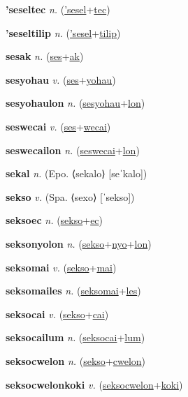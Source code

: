 \textbf{\hypertarget{'seseltec}{'seseltec}} \textit{n.} (\hyperlink{'sesel}{'sesel}+\allowbreak \hyperlink{tec}{tec})


\textbf{\hypertarget{'seseltilip}{'seseltilip}} \textit{n.} (\hyperlink{'sesel}{'sesel}+\allowbreak \hyperlink{tilip}{tilip})


\textbf{\hypertarget{sesak}{sesak}} \textit{n.} (\hyperlink{ses}{ses}+\allowbreak \hyperlink{ak}{ak})


\textbf{\hypertarget{sesyohau}{sesyohau}} \textit{v.} (\hyperlink{ses}{ses}+\allowbreak \hyperlink{yohau}{yohau})


\textbf{\hypertarget{sesyohaulon}{sesyohaulon}} \textit{n.} (\hyperlink{sesyohau}{sesyohau}+\allowbreak \hyperlink{lon}{lon})


\textbf{\hypertarget{seswecai}{seswecai}} \textit{v.} (\hyperlink{ses}{ses}+\allowbreak \hyperlink{wecai}{wecai})


\textbf{\hypertarget{seswecailon}{seswecailon}} \textit{n.} (\hyperlink{seswecai}{seswecai}+\allowbreak \hyperlink{lon}{lon})


\textbf{\hypertarget{sekal}{sekal}} \textit{n.} (Epo. ⟨sekalo⟩ [seˈkalo])


\textbf{\hypertarget{sekso}{sekso}} \textit{v.} (Spa. ⟨sexo⟩ [ˈsekso])


\textbf{\hypertarget{seksoec}{seksoec}} \textit{n.} (\hyperlink{sekso}{sekso}+\allowbreak \hyperlink{ec}{ec})


\textbf{\hypertarget{seksonyolon}{seksonyolon}} \textit{n.} (\hyperlink{sekso}{sekso}+\allowbreak \hyperlink{nyo}{nyo}+\allowbreak \hyperlink{lon}{lon})


\textbf{\hypertarget{seksomai}{seksomai}} \textit{v.} (\hyperlink{sekso}{sekso}+\allowbreak \hyperlink{mai}{mai})


\textbf{\hypertarget{seksomailes}{seksomailes}} \textit{n.} (\hyperlink{seksomai}{seksomai}+\allowbreak \hyperlink{les}{les})


\textbf{\hypertarget{seksocai}{seksocai}} \textit{v.} (\hyperlink{sekso}{sekso}+\allowbreak \hyperlink{cai}{cai})


\textbf{\hypertarget{seksocailum}{seksocailum}} \textit{n.} (\hyperlink{seksocai}{seksocai}+\allowbreak \hyperlink{lum}{lum})


\textbf{\hypertarget{seksocwelon}{seksocwelon}} \textit{n.} (\hyperlink{sekso}{sekso}+\allowbreak \hyperlink{cwelon}{cwelon})


\textbf{\hypertarget{seksocwelonkoki}{seksocwelonkoki}} \textit{v.} (\hyperlink{seksocwelon}{seksocwelon}+\allowbreak \hyperlink{koki}{koki})


